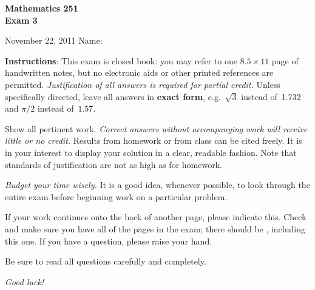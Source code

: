 \documentclass[12pt]{exam}
\begin{document}
\addpoints

\noindent
\textbf{{\large Mathematics 251 \\ Exam 3}}

\noindent
November 22, 2011  \hfill Name: \underline{\hspace{3in}}


\noindent
\textbf{Instructions}: This exam is closed book: you may refer to one $8.5 \times 11$ page of handwritten notes, but no electronic aids or
other printed references are permitted. \emph{Justification of all answers is required
for partial credit.} Unless
specifically directed, leave all answers in \textbf{exact form}, e.g.\
$\sqrt{3}$ instead of~1.732 and $\pi/2$ instead of~$1.57$.

Show all pertinent work. \emph{Correct answers without accompanying work will receive little or no credit.} Results from homework or from class can be cited freely. It is in your interest to display your solution in a
clear, readable fashion. Note that standards of justification are not as high as for homework.

\emph{Budget your time wisely.} It is a good idea, whenever possible, to look through the entire exam before beginning work on a particular problem.

If your work continues onto the back of another page, please indicate
this. Check and make sure you have all of the pages in the
exam; there should be \numpages, including this one. If you have a
question, please raise your hand.

Be sure to read all questions carefully and completely.

\vspace*{1.0in}

\begin{center}
\combinedgradetable[h]
\end{center}

\vspace*{0.5in}

\begin{center}
{\Large \emph{Good luck!}}
\end{center}

\newpage
\end{document}

